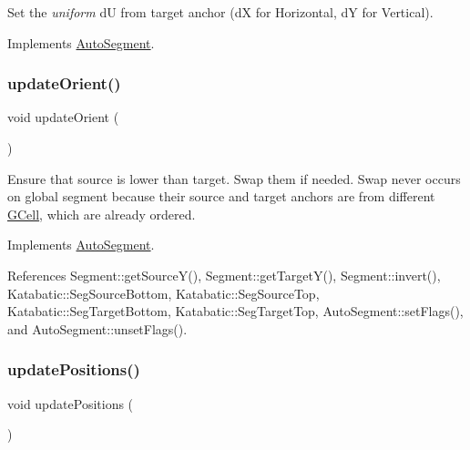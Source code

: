Set the {\itshape uniform} {\ttfamily dU} from target anchor (dX for Horizontal, dY for Vertical). 

Implements \hyperlink{classKatabatic_1_1AutoSegment_a246756d4c8b3e094a0a9d6de3c2109ff}{Auto\+Segment}.

\mbox{\label{classKatabatic_1_1AutoVertical_a59058f4593049c583c5b3698ff81b299}} 
\subsubsection{\texorpdfstring{update\+Orient()}{updateOrient()}}
{\footnotesize\ttfamily void update\+Orient (\begin{DoxyParamCaption}{ }\end{DoxyParamCaption})\hspace{0.3cm}{\ttfamily [virtual]}}

Ensure that source is lower than target. Swap them if needed. Swap never occurs on global segment because their source and target anchors are from different \hyperlink{classKatabatic_1_1GCell}{G\+Cell}, which are already ordered. 

Implements \hyperlink{classKatabatic_1_1AutoSegment_a102e0f4bbb0386e41be214d15a9e4549}{Auto\+Segment}.



References Segment\+::get\+Source\+Y(), Segment\+::get\+Target\+Y(), Segment\+::invert(), Katabatic\+::\+Seg\+Source\+Bottom, Katabatic\+::\+Seg\+Source\+Top, Katabatic\+::\+Seg\+Target\+Bottom, Katabatic\+::\+Seg\+Target\+Top, Auto\+Segment\+::set\+Flags(), and Auto\+Segment\+::unset\+Flags().

\mbox{\label{classKatabatic_1_1AutoVertical_a9662a77c2ed8553d6a0312c5292060ad}} 
\subsubsection{\texorpdfstring{update\+Positions()}{updatePositions()}}
{\footnotesize\ttfamily void update\+Positions (\begin{DoxyParamCaption}{ }\end{DoxyParamCaption})\hspace{0.3cm}{\ttfamily [virtual]}}

